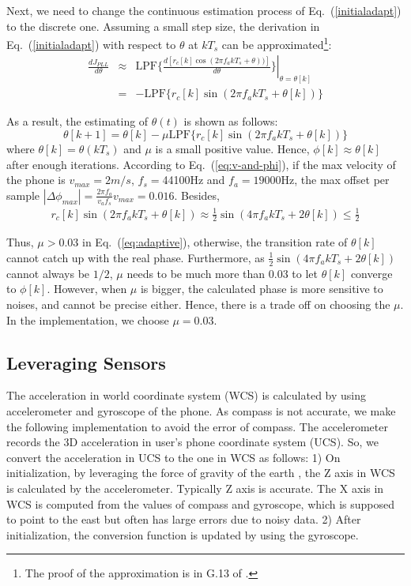 \documentclass[]{sig-alternate-10pt}
\newcommand{\eqqref}[1]{Eq.~(\ref{#1})}
\begin{document}
Next,  we need to change the continuous estimation process of \eqqref{initialadapt} to the discrete
one.
Assuming a small step size, the derivation in \eqqref{initialadapt}
with respect to $\theta$ at $kT_{s}$ can be approximated\footnote{The
  proof of the approximation is in G.13 of \cite{citeulike:5657344}.}:
\begin{eqnarray*}
    \frac{dJ_{PLL}}{d\theta} & \approx & \left. \textrm{LPF}\{\frac{d[r_c[k]\cos(2\pi f_{a}kT_{s}+\theta))]}{d\theta}\} \right|_{\theta=\theta[k]}\\
    & = & -\textrm{LPF}\{r_c[k]\sin(2\pi f_{a}kT_{s}+\theta[k])\}
\end{eqnarray*}

As a result, the estimating of $\theta(t)$ is shown as follows:
\begin{equation}
    \theta[k+1]=\theta[k]-\mu \textrm{LPF}\{r_c[k]\sin(2\pi
        f_{a}kT_{s}+\theta[k])\}\label{eq:adaptive}
\end{equation}
where $\theta[k]=\theta(kT_{s})$ and $\mu$ is a small positive value.
Hence, $\phi[k]\approx\theta[k]$ after enough iterations.
According to \eqqref{eq:v-and-phi}, if the max velocity of the phone is
$v_{max}=2m/s$,
$f_{s}=$44100Hz and $f_{a}=19000$Hz, the max offset per sample
$|\Delta\phi_{max}|=\frac{2\pi f_{a}}{v_{a}f_{s}}v_{max}=0.016$.
Besides,
\[
\begin{array}{l}
     r_{c}[k]\sin(2\pi f_{a}kT_{s}+\theta[k]) \approx  \frac{1}{2}\sin(4\pi f_{a}kT_{s}+2\theta[k])\leq \frac{1}{2}
\end{array}
\]

Thus, $\mu>0.03$
in \eqqref{eq:adaptive}, otherwise, the transition rate of $\theta[k]$
cannot catch up with the real phase. Furthermore, as
$\frac{1}{2}\sin(4\pi f_{a}kT_{s}+2\theta[k])$ cannot always be $1/2$,
$\mu$ needs to be much more than $0.03$ to let $\theta[k]$ converge
to $\phi[k]$.
However, when $\mu$ is bigger, the calculated phase is more sensitive
to noises, and cannot be precise either. Hence, there is a trade off on
choosing the $\mu$.  In the implementation, we choose $\mu=0.03$.


\subsection{Leveraging Sensors}
The acceleration in world
 coordinate system (WCS) is calculated by using accelerometer and
 gyroscope of the phone.
As compass is not accurate,  we make the following implementation to
 avoid the error of compass.
The accelerometer records the 3D acceleration in user's phone
 coordinate system (UCS).
So, we convert the acceleration in UCS to the one in WCS as follows: 1) On
initialization, by leveraging the force of gravity of the earth
\cite{zaxis}, the Z axis in WCS is calculated by the accelerometer.
Typically Z axis is accurate.
The X axis in WCS is computed from the values of compass and gyroscope,
 which is supposed to point to the east but often has large errors due
 to noisy data.
2) After initialization, the conversion
 function is updated by using the gyroscope.
\end{document}
